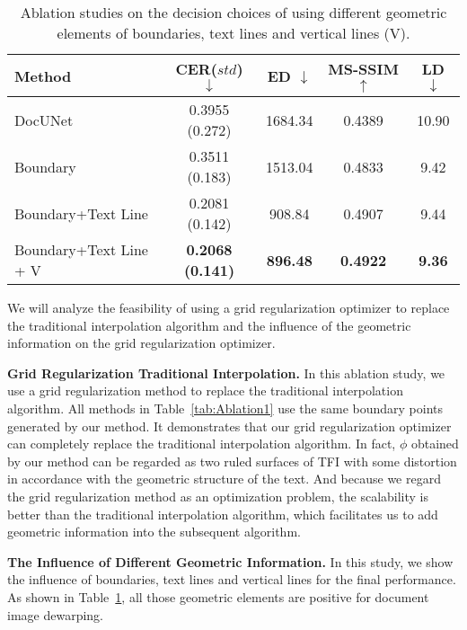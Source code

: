 \documentclass[10pt,twocolumn,letterpaper]{article}
\newcommand{\myparagraph}[1]{\vspace{1pt} \noindent \textbf{#1} }
\begin{document}
\begin{table}[!t]
\scriptsize
  \centering
\caption{Ablation studies on the decision choices of using different geometric elements of boundaries, text lines and vertical lines (V).}
  \vspace{-2mm}
  \begin{tabular}{lcccc}
    \toprule
    \textbf{Method} &  \textbf{CER}($std$) $\downarrow$ & \textbf{ED} $\downarrow$ &\textbf{MS-SSIM} $\uparrow$ & \textbf{LD} $\downarrow$\\
    \midrule
    DocUNet & 0.3955 (0.272) & 1684.34 & 0.4389 & 10.90\\
    Boundary & 0.3511 (0.183) & 1513.04 & 0.4833 & 9.42\\  
    Boundary+Text Line & 0.2081 (0.142) &908.84 & 0.4907 & 9.44\\ 
    Boundary+Text Line + V & \textbf{0.2068 (0.141)} & \textbf{896.48} & \textbf{0.4922} & \textbf{9.36}\\ 
    \bottomrule
  \end{tabular}
  \label{tab:Ablation2}
  \vspace{3mm}
\end{table}

We will analyze the feasibility of using a grid regularization optimizer to replace the traditional interpolation algorithm and the influence of the geometric information on the grid regularization optimizer.

\myparagraph{Grid Regularization \vs Traditional Interpolation.} In this ablation study, we use a grid regularization method to replace the traditional interpolation algorithm. All methods in Table~\ref{tab:Ablation1} use the same boundary points generated by our method. It demonstrates that our grid regularization optimizer can completely replace the traditional interpolation algorithm. In fact, $\phi$ obtained by our method can be regarded as two ruled surfaces of TFI with some distortion in accordance with the geometric structure of the text. And because we regard the grid regularization method as an optimization problem, the scalability is better than the traditional interpolation algorithm, which facilitates us to add geometric information into the subsequent algorithm.

\vspace{-1mm}
\myparagraph{The Influence of Different Geometric Information.}
In this study, we show the influence of boundaries, text lines and vertical lines for the final performance. As shown in Table~\ref{tab:Ablation2}, all those geometric elements are positive for document image dewarping.
\end{document}
